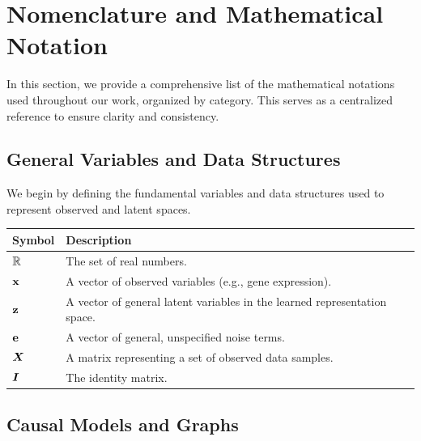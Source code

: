 \section{Nomenclature and Mathematical Notation}
\label{app:nomenclature}

In this section, we provide a comprehensive list of the mathematical notations used throughout our work, organized by category.
This serves as a centralized reference to ensure clarity and consistency.

\subsection{General Variables and Data Structures}
\label{app:nomenclature:general}

We begin by defining the fundamental variables and data structures used to represent observed and latent spaces.

\begin{table}[H]
\begin{tabularx}{\textwidth}{l X}
\toprule
\textbf{Symbol} & \textbf{Description} \\
\midrule
$\mathbb{R}$ & The set of real numbers. \\
${\mathbf{x}}$ & A vector of observed variables (e.g., gene expression). \\
${\mathbf{z}}$ & A vector of general latent variables in the learned representation space. \\
${\mathbf{e}}$ & A vector of general, unspecified noise terms. \\
${\bm{X}}$ & A matrix representing a set of observed data samples. \\
${\bm{I}}$ & The identity matrix. \\
\bottomrule
\end{tabularx}
\end{table}

\subsection{Causal Models and Graphs}
\label{app:nomenclature:causal}

